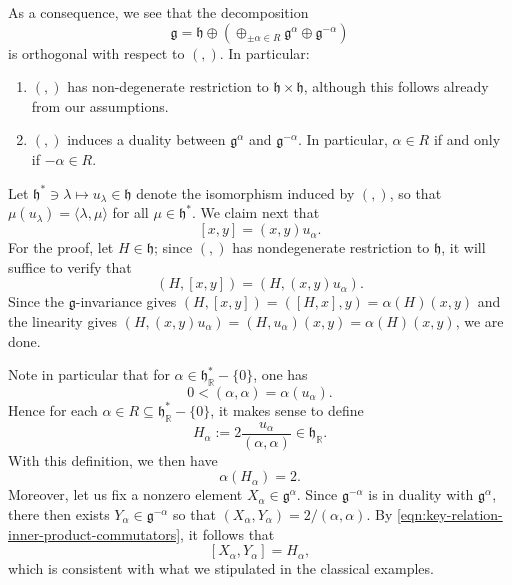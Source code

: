 \documentclass[reqno]{amsart} 
\begin{document}
As a consequence, we see that the decomposition
\begin{equation}
  \mathfrak{g} = \mathfrak{h} \oplus (\oplus_{\pm \alpha \in R}
  \mathfrak{g}^{\alpha} \oplus \mathfrak{g}^{-\alpha})
\end{equation}
is orthogonal with respect to $(,)$.  In particular:
\begin{enumerate}
\item $(,)$ has non-degenerate restriction to $\mathfrak{h} \times \mathfrak{h}$, although this follows already from our assumptions.
\item $(,)$ induces a duality between $\mathfrak{g}^\alpha$ and $\mathfrak{g}^{-\alpha}$.  In particular, $\alpha \in R$ if and only if $- \alpha \in R$.
\end{enumerate}

Let $\mathfrak{h}^* \ni \lambda \mapsto u_\lambda \in \mathfrak{h}$ denote the isomorphism induced by $(,)$, so that $\mu(u_\lambda) = \langle \lambda,\mu \rangle$ for all $\mu \in \mathfrak{h}^*$.  We claim next that
\begin{equation}\label{eqn:key-relation-inner-product-commutators}
  {} [x,y] = (x,y) u_\alpha.
\end{equation}
For the proof, let $H \in \mathfrak{h}$; since $(,)$ has nondegenerate restriction to $\mathfrak{h}$, it will suffice to verify that
\begin{equation*}
  (H,[x,y]) = (H,(x,y) u_\alpha).
\end{equation*}
Since the $\mathfrak{g}$-invariance gives $(H,[x,y]) = ([H,x],y) = \alpha(H) (x,y)$ and the linearity gives $(H,(x,y) u_\alpha) = (H,u_\alpha) (x,y) = \alpha(H) (x,y)$, we are done.

Note in particular that for $\alpha \in \mathfrak{h}_\mathbb{R}^* - \{0\}$, one has
\begin{equation*}
  0 < (\alpha,\alpha) = \alpha(u_\alpha).
\end{equation*}
Hence for each $\alpha \in R \subseteq \mathfrak{h}_\mathbb{R}^* - \{0\}$, it makes sense to define
\begin{equation*}
  H_\alpha := 2 \frac{u_\alpha}{(\alpha,\alpha)} \in \mathfrak{h}_\mathbb{R}.
\end{equation*}
With this definition, we then have
\begin{equation*}
  \alpha(H_\alpha) = 2.
\end{equation*}
Moreover, let us fix a nonzero element $X_\alpha \in \mathfrak{g}^\alpha$.  Since $\mathfrak{g}^{-\alpha}$ is in duality with $\mathfrak{g}^\alpha$, there then exists $Y_\alpha \in \mathfrak{g}^{-\alpha}$ so that $(X_\alpha,Y_\alpha) = 2 / (\alpha,\alpha)$.  By \eqref{eqn:key-relation-inner-product-commutators}, it follows that
\begin{equation*}
  {} [X_\alpha,Y_\alpha] = H_\alpha,
\end{equation*}
which is consistent with what we stipulated in the classical examples.
\end{document}
